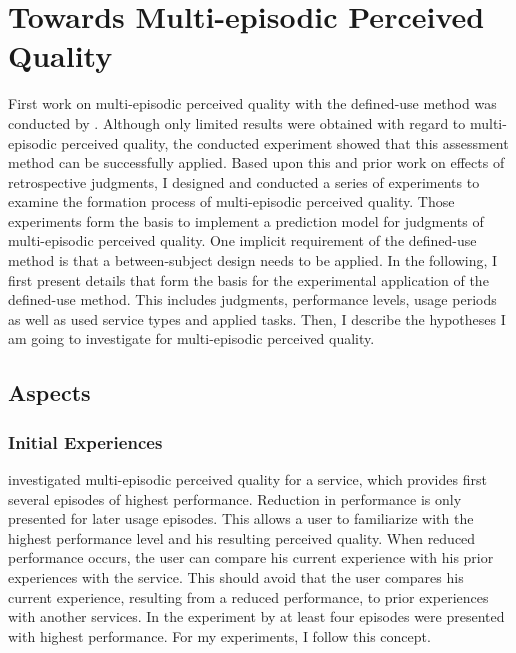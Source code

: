 \chapter{Towards Multi-episodic Perceived Quality}\label{chap:towards}
First work on multi-episodic perceived quality with the  defined-use method was conducted by \citet{moller_single-call_2011}.
Although only limited results were obtained with regard to multi-episodic perceived quality, the conducted experiment showed that this assessment method can be successfully applied.
Based upon this and prior work on effects of retrospective judgments, I designed and conducted a series of experiments to examine the formation process of multi-episodic perceived quality. 
Those experiments form the basis to implement a prediction model for judgments of multi-episodic perceived quality.
One implicit requirement of the defined-use method is that a between-subject design needs to be applied.
In the following, I first present details that form the basis for the experimental application of the defined-use method.
This includes judgments, performance levels, usage periods as well as used service types and applied tasks.
Then, I describe the hypotheses I am going to investigate for multi-episodic perceived quality.

\section{Aspects}

\subsection{Initial Experiences}
\citet{moller_single-call_2011} investigated multi-episodic perceived quality for a service, which provides first several episodes of highest performance.
Reduction in performance is only presented for later usage episodes.
This allows a user to familiarize with the highest performance level and his resulting perceived quality.
When reduced performance occurs, the user can compare his current experience with his prior experiences with the service.
This should avoid that the user compares his current experience, resulting from a reduced performance, to prior experiences with another services.
In the experiment by \citet{moller_single-call_2011} at least four episodes were presented with highest performance.
For my experiments, I follow this concept.

